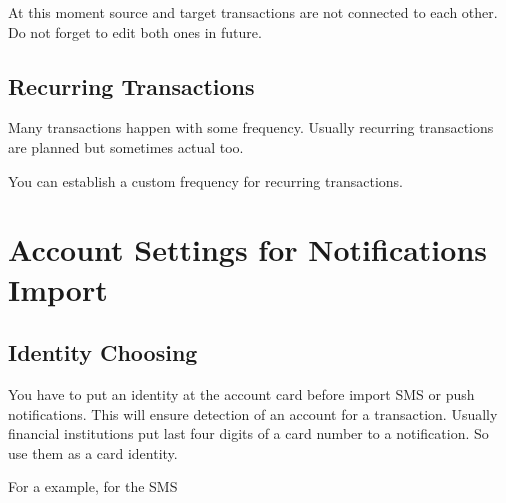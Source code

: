 \documentclass[a4paper,10pt,english]{sphinxmanual}
\begin{document}
\sphinxAtStartPar
At this moment source and target transactions are not connected to each other.
Do not forget to edit both ones in future.


\section{Recurring Transactions}
\label{\detokenize{transactions:recurring-transactions}}
\sphinxAtStartPar
Many transactions happen with some frequency. Usually recurring transactions
are planned but sometimes actual too.

\sphinxAtStartPar
You can establish a custom frequency for recurring transactions.

\noindent{}
\noindent{}
\noindent{}
\noindent{}

\sphinxstepscope


\chapter{Account Settings for Notifications Import}
\label{\detokenize{account-identities:account-settings-for-notifications-import}}\label{\detokenize{account-identities:chapter-account-identities}}\label{\detokenize{account-identities::doc}}

\section{Identity Choosing}
\label{\detokenize{account-identities:identity-choosing}}
\sphinxAtStartPar
You have to put an identity at the account card before import SMS or push notifications.
This will ensure detection of an account for a transaction. Usually financial institutions
put last four digits of a card number to a notification. So use them as a card identity.

\sphinxAtStartPar
For a example, for the SMS

\begin{sphinxVerbatim}[commandchars=\\\{\}]
        
\end{sphinxVerbatim}
\end{document}
